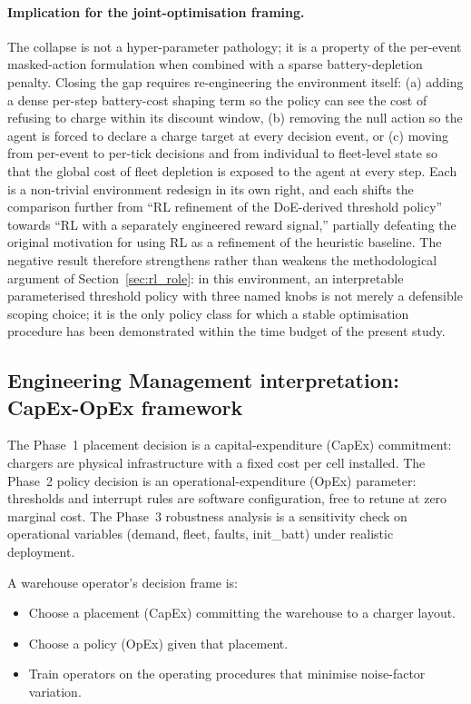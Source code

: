 \documentclass[conference]{IEEEtran}
\begin{document}
\paragraph{Implication for the joint-optimisation framing.}
The collapse is not a hyper-parameter pathology; it is a property of the per-event masked-action formulation when combined with a sparse battery-depletion penalty. Closing the gap requires re-engineering the environment itself: (a) adding a dense per-step battery-cost shaping term so the policy can see the cost of refusing to charge within its discount window, (b) removing the null action so the agent is forced to declare a charge target at every decision event, or (c) moving from per-event to per-tick decisions and from individual to fleet-level state so that the global cost of fleet depletion is exposed to the agent at every step. Each is a non-trivial environment redesign in its own right, and each shifts the comparison further from ``RL refinement of the DoE-derived threshold policy'' towards ``RL with a separately engineered reward signal,'' partially defeating the original motivation for using RL as a refinement of the heuristic baseline. The negative result therefore strengthens rather than weakens the methodological argument of Section~\ref{sec:rl_role}: in this environment, an interpretable parameterised threshold policy with three named knobs is not merely a defensible scoping choice; it is the only policy class for which a stable optimisation procedure has been demonstrated within the time budget of the present study.

\subsection{Engineering Management interpretation: CapEx-OpEx framework}
\label{sec:capex_opex}

The Phase~1 placement decision is a capital-expenditure (CapEx) commitment: chargers are physical infrastructure with a fixed cost per cell installed. The Phase~2 policy decision is an operational-expenditure (OpEx) parameter: thresholds and interrupt rules are software configuration, free to retune at zero marginal cost. The Phase~3 robustness analysis is a sensitivity check on operational variables (demand, fleet, faults, init\_batt) under realistic deployment.

A warehouse operator's decision frame is:
\begin{itemize}
  \item Choose a placement (CapEx) committing the warehouse to a charger layout.
  \item Choose a policy (OpEx) given that placement.
  \item Train operators on the operating procedures that minimise noise-factor variation.
\end{itemize}
\end{document}
